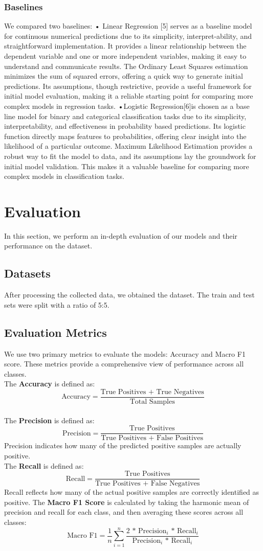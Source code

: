 \documentclass[10pt,sigconf,letterpaper,nonacm]{acmart}
\begin{document}
\subsubsection{Baselines}
 We compared two baselines:
• Linear Regression [5] serves as a baseline model for
continuous numerical predictions due to its simplicity,
interpret-ability, and straightforward implementation. It
provides a linear relationship between the dependent
variable and one or more independent variables, making
it easy to understand and communicate results. The Ordinary Least Squares estimation minimizes the sum of
squared errors, offering a quick way to generate initial
predictions. Its assumptions, though restrictive, provide
a useful framework for initial model evaluation, making
it a reliable starting point for comparing more complex
models in regression tasks.
•Logistic Regression[6]is chosen as a base line model for
binary and categorical classification tasks due to its simplicity, interpretability, and effectiveness in probability
based predictions. Its logistic function directly maps features to probabilities, offering clear insight into the likelihood of a particular outcome. Maximum Likelihood
Estimation provides a robust way to fit the model to data,
and its assumptions lay the groundwork for initial model validation. This makes it a valuable baseline for comparing more complex models in classification tasks.
\section{Evaluation}
In this section, we perform an in-depth evaluation of our models and their performance on the dataset.
\subsection{Datasets}
After processing the collected data, we obtained the dataset. The train and test sets were
split with a ratio of 5:5.
\subsection{Evaluation Metrics}
We use two primary metrics to evaluate the models: Accuracy
and Macro F1 score. These metrics provide a comprehensive
view of performance across all classes.\\
The \textbf{Accuracy} is defined as:
\[
\text{Accuracy} = \frac{\text{True Positives + True Negatives}}{\text{Total Samples}}
\]\\
The \textbf{Precision} is defined as:
\[
\text{Precision} = \frac {\text{True Positives}}
{\text{True Positives + False Positives}}
\]
Precision indicates how many of the predicted positive
samples are actually positive.\\
The \textbf{Recall} is defined as:
\[
\text{Recall} = \frac{\text{True Positives}}
{\text{True Positives + False Negatives}}
\]
Recall reflects how many of the actual positive samples
are correctly identified as positive.
The \textbf{Macro F1 Score} is calculated by taking the harmonic
mean of precision and recall for each class, and then averaging these scores across all classes:
\[
\text{Macro F1} = \frac{1}{n}\sum_{i=1}^{n}\frac{\text{2 * Precision$_i$ * Recall$_i$}}{\text{Precision$_i$ * Recall$_i$}}
\]
\end{document}
